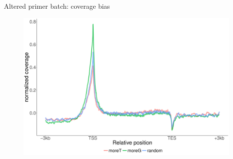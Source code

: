 \documentclass[10pt]{beamer}
\begin{document}
\begin{frame}{Altered primer batch: coverage bias}
  \begin{figure}
    \includegraphics[scale=0.25]{bias_profiles_D2.pdf}
  \end{figure}
\end{frame}

\begin{frame}{}

\end{frame}
\end{document}
